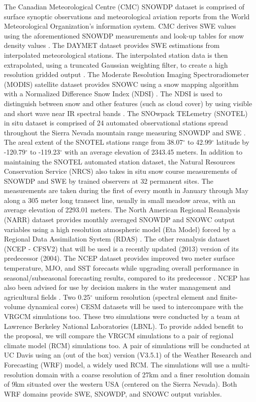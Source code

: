 \documentclass[11pt]{article}
\begin{document}
The Canadian Meteorological Centre (CMC) SNOWDP dataset is comprised of surface synoptic observations and meteorological aviation reports from the World Meteorological Organization’s information system.  CMC derives SWE values using the aforementioned SNOWDP measurements and look-up tables for snow density values \citep{brown2003gridded}.  The DAYMET dataset provides SWE estimations from interpolated meteorological stations.  The interpolated station data is then extrapolated, using a truncated Gaussian weighting filter, to create a high resolution gridded output \citep{thornton2012daymet}.  The Moderate Resolution Imaging Spectroradiometer (MODIS) satellite dataset provides SNOWC using a snow mapping algorithm with a Normalized Difference Snow Index (NDSI) \citep{salomonson2006development}.  The NDSI is used to distinguish between snow and other features (such as cloud cover) by using visible and short wave near IR spectral bands \citep{salomonson2006development}.  The SNOwpack TELemetry (SNOTEL) in situ dataset is comprised of 24 automated observational stations spread throughout the Sierra Nevada mountain range measuring SNOWDP and SWE \citep{serreze1999characteristics}.  The areal extent of the SNOTEL stations range from 38.07$^\circ$ to 42.99$^\circ$ latitude by -120.79$^\circ$ to -119.23$^\circ$ with an average elevation of 2343.45 meters.  In addition to maintaining the SNOTEL automated station dataset, the Natural Resources Conservation Service (NRCS) also takes in situ snow course measurements of SNOWDP and SWE by trained observers at 32 permanent sites.  The measurements are taken during the first of every month in January through May along a 305 meter long transect line, usually in small meadow areas, with an average elevation of 2293.01 meters.  The North American Regional Reanalysis (NARR) dataset provides monthly averaged SNOWDP and SNOWC output variables using a high resolution atmospheric model (Eta Model) forced by a Regional Data Assimilation System (RDAS) \citep{mesinger2006north}.  The other reanalysis dataset (NCEP - CFSV2) that will be used is a recently updated (2013) version of its predecessor (2004).  The NCEP dataset provides improved two meter surface temperature, MJO, and SST forecasts while upgrading overall performance in seasonal/subseasonal forecasting results, compared to its predecessor \citep{saha2014ncep}. NCEP has also been advised for use by decision makers in the water management and agricultural fields \citep{saha2014ncep}.  Two 0.25$^\circ$ uniform resolution (spectral element and finite-volume dynamical cores) CESM datasets will be used to intercompare with the VRGCM simulations too.  These two simulations were conducted by a team at Lawrence Berkeley National Laboratories (LBNL). To provide added benefit to the proposal, we will compare the VRGCM simulations to a pair of regional climate model (RCM) simulations too.  A pair of simulations will be conducted at UC Davis using an (out of the box) version (V3.5.1) of the Weather Research and Forecasting (WRF) model, a widely used RCM.  The simulations will use a multi-resolution domain with a coarse resolution of 27km and a finer resolution domain of 9km situated over the western USA (centered on the Sierra Nevada).  Both WRF domains provide SWE, SNOWDP, and SNOWC output variables.
\end{document}
